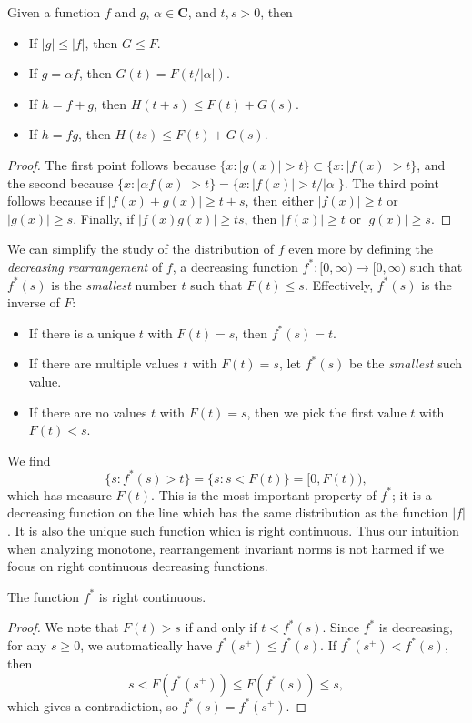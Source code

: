 \begin{lemma}
  Given a function $f$ and $g$, $\alpha \in \mathbf{C}$, and $t,s > 0$, then
  \begin{itemize}
    \item If $|g| \leq |f|$, then $G \leq F$.
    \item If $g = \alpha f$, then $G(t) = F(t/|\alpha|)$.
    \item If $h = f + g$, then $H(t+s) \leq F(t) + G(s)$.
    \item If $h = fg$, then $H(ts) \leq F(t) + G(s)$.
  \end{itemize}
\end{lemma}
\begin{proof}
    The first point follows because $\{ x : |g(x)| > t \} \subset \{ x : |f(x)| > t \}$, and the second because $\{ x : |\alpha f(x)| > t \} = \{ x : |f(x)| > t/|\alpha| \}$. The third point follows because if $|f(x) + g(x)| \geq t + s$, then either $|f(x)| \geq t$ or $|g(x)| \geq s$. Finally, if $|f(x) g(x)| \geq ts$, then $|f(x)| \geq t$ or $|g(x)| \geq s$.
\end{proof}

We can simplify the study of the distribution of $f$ even more by defining the \emph{decreasing rearrangement} of $f$, a decreasing function $f^*: [0,\infty) \to [0,\infty)$ such that $f^*(s)$ is the \emph{smallest} number $t$ such that $F(t) \leq s$. Effectively, $f^*(s)$ is the inverse of $F$:
%
\begin{itemize}
    \item If there is a unique $t$ with $F(t) = s$, then $f^*(s) = t$.
    \item If there are multiple values $t$ with $F(t) = s$, let $f^*(s)$ be the \emph{smallest} such value.
    \item If there are no values $t$ with $F(t) = s$, then we pick the first value $t$ with $F(t) < s$.
\end{itemize}
%
We find
%
\[ \{ s : f^*(s) > t \} = \{ s : s < F(t) \} = [0,F(t)), \]
%
which has measure $F(t)$. This is the most important property of $f^*$; it is a decreasing function on the line which has the same distribution as the function $|f|$. It is also the unique such function which is right continuous. Thus our intuition when analyzing monotone, rearrangement invariant norms is not harmed if we focus on right continuous decreasing functions.

\begin{theorem}
    The function $f^*$ is right continuous.
\end{theorem}
\begin{proof}
    We note that $F(t) > s$ if and only if $t < f^*(s)$. Since $f^*$ is decreasing, for any $s \geq 0$, we automatically have $f^*(s^+) \leq f^*(s)$. If $f^*(s^+) < f^*(s)$, then
    \[ s < F \left( f^*(s^+) \right) \leq F(f^*(s)) \leq s, \]
    which gives a contradiction, so $f^*(s) = f^*(s^+)$.
\end{proof}

